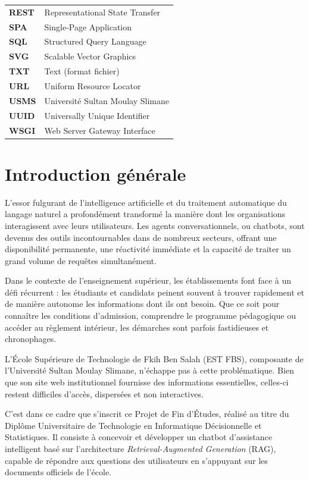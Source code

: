 \documentclass[12pt, a4paper, twoside]{report}
\newcommand{\term}[1]{\textit{\color{primary}#1}}
\begin{document}
\begin{longtable}{>{\bfseries}p{3.5cm} p{10cm}}
REST   & Representational State Transfer \\
SPA    & Single-Page Application \\
SQL    & Structured Query Language \\
SVG    & Scalable Vector Graphics \\
TXT    & Text (format fichier) \\
URL    & Uniform Resource Locator \\
USMS   & Université Sultan Moulay Slimane \\
UUID   & Universally Unique Identifier \\
WSGI   & Web Server Gateway Interface \\
\end{longtable}
\cleardoublepage

\chapter*{Introduction générale}

L'essor fulgurant de l'intelligence artificielle et du traitement automatique du langage naturel a profondément transformé la manière dont les organisations interagissent avec leurs utilisateurs. Les agents conversationnels, ou chatbots, sont devenus des outils incontournables dans de nombreux secteurs, offrant une disponibilité permanente, une réactivité immédiate et la capacité de traiter un grand volume de requêtes simultanément.

Dans le contexte de l'enseignement supérieur, les établissements font face à un défi récurrent : les étudiants et candidats peinent souvent à trouver rapidement et de manière autonome les informations dont ils ont besoin. Que ce soit pour connaître les conditions d'admission, comprendre le programme pédagogique ou accéder au règlement intérieur, les démarches sont parfois fastidieuses et chronophages.

L'École Supérieure de Technologie de Fkih Ben Salah (EST FBS), composante de l'Université Sultan Moulay Slimane, n'échappe pas à cette problématique. Bien que son site web institutionnel fournisse des informations essentielles, celles-ci restent difficiles d'accès, dispersées et non interactives.

C'est dans ce cadre que s'inscrit ce Projet de Fin d'Études, réalisé au titre du Diplôme Universitaire de Technologie en Informatique Décisionnelle et Statistiques. Il consiste à concevoir et développer un chatbot d'assistance intelligent basé sur l'architecture \term{Retrieval-Augmented Generation} (RAG), capable de répondre aux questions des utilisateurs en s'appuyant sur les documents officiels de l'école.
\end{document}
